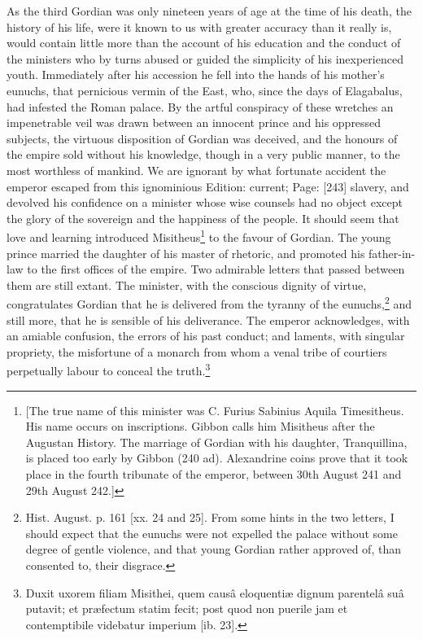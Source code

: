 As the third Gordian was only nineteen years of age at the time of his death, the history of his life, were it known to us with greater accuracy than it really is, would contain little more than the account of his education and the conduct of the ministers who by turns abused or guided the simplicity of his inexperienced youth. Immediately after his accession he fell into the hands of his mother\texthebrew{}’s eunuchs, that pernicious vermin of the East, who, since the days of Elagabalus, had infested the Roman palace. By the artful conspiracy of these wretches an impenetrable veil was drawn between an innocent prince and his oppressed subjects, the virtuous disposition of Gordian was deceived, and the honours of the empire sold without his knowledge, though in a very public manner, to the most worthless of mankind. We are ignorant by what fortunate accident the emperor escaped from this ignominious Edition: current; Page: [243] slavery, and devolved his confidence on a minister whose wise counsels had no object except the glory of the sovereign and the happiness of the people. It should seem that love and learning introduced Misitheus\footnote{[The true name of this minister was C. Furius Sabinius Aquila Timesitheus. His name occurs on inscriptions. Gibbon calls him Misitheus after the Augustan History. The marriage of Gordian with his daughter, Tranquillina, is placed too early by Gibbon (240 ad). Alexandrine coins prove that it took place in the fourth tribunate of the emperor, between 30th August 241 and 29th August 242.]} to the favour of Gordian. The young prince married the daughter of his master of rhetoric, and promoted his father-in-law to the first offices of the empire. Two admirable letters that passed between them are still extant. The minister, with the conscious dignity of virtue, congratulates Gordian that he is delivered from the tyranny of the eunuchs,\footnote{Hist. August. p. 161 [xx. 24 and 25]. From some hints in the two letters, I should expect that the eunuchs were not expelled the palace without some degree of gentle violence, and that young Gordian rather approved of, than consented to, their disgrace.} and still more, that he is sensible of his deliverance. The emperor acknowledges, with an amiable confusion, the errors of his past conduct; and laments, with singular propriety, the misfortune of a monarch from whom a venal tribe of courtiers perpetually labour to conceal the truth.\footnote{Duxit uxorem filiam Misithei, quem causâ eloquentiæ dignum parentelâ suâ putavit; et præfectum statim fecit; post quod non puerile jam et contemptibile videbatur imperium [ib. 23].}

